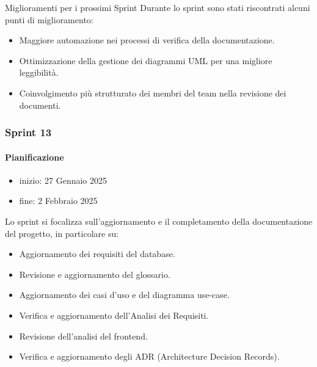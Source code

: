 \documentclass{article}
\begin{document}
                Miglioramenti per i prossimi Sprint
                Durante lo sprint sono stati riscontrati alcuni punti di miglioramento:
                \begin{itemize}
                    \item Maggiore automazione nei processi di verifica della documentazione.
                    \item Ottimizzazione della gestione dei diagrammi UML per una migliore leggibilità.
                    \item Coinvolgimento più strutturato dei membri del team nella revisione dei documenti.
                \end{itemize}
            \subsubsection{Sprint 13}
                \paragraph{Pianificazione}
                \begin{itemize}
                    \item inizio: 27 Gennaio 2025
                    \item fine: 2 Febbraio 2025
                \end{itemize}
                Lo sprint si focalizza sull'aggiornamento e il completamento della documentazione del progetto, in particolare su:
                \begin{itemize}
                    \item Aggiornamento dei requisiti del database.
                    \item Revisione e aggiornamento del glossario.
                    \item Aggiornamento dei casi d'uso e del diagramma use-case.
                    \item Verifica e aggiornamento dell'Analisi dei Requisiti.
                    \item Revisione dell'analisi del frontend.
                    \item Verifica e aggiornamento degli ADR (Architecture Decision Records).
                \end{itemize}
\end{document}
